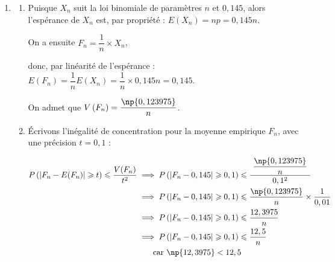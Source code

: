 \begin{enumerate}
\begin{enumerate}
\item Résolvons, pour $n$ entier naturel :

$\begin{aligned}
p_n \geqslant 0,99
&\iff 1 - 0,855^{n} \geqslant 0,99\\
&\iff  - 0,855^{n} \geqslant -0,01\\
&\iff 0,855^{n} \leqslant 0,01\quad \text{car } -1<0\\
&\iff \ln\left(0,855^{n}\right) \leqslant \ln(0,01) \quad \text{car ln est croissante sur }\R^{*+}\\
	&\iff n\ln\left(0,855\right) \leqslant \ln(0,01)\\
	&\iff n \geqslant \dfrac{\ln(0,01)}{\ln\left(0,855\right)} \quad \text{car } 0,855 <1 \text{ donc }\ln\left(0,855\right) < 0\\
\end{aligned}$

Or $\dfrac{\ln(0,01)}{\ln\left(0,855\right)} \approx 29,4$, donc c'est à partir de $n = 30$ que l'on a une probabilité $p_n$ supérieure ou égale à 0,99.
\end{enumerate}

\item 
	\begin{enumerate}
		\item Puisque $X_n$ suit la loi binomiale de paramètres $n$ et $0,145$, alors l'espérance de $X_n$ est, par propriété : $E(X_n) = np = 0,145n$.

On a ensuite $F_n = \dfrac{1}{n} \times X_n$,

donc, par linéarité de l'espérance : $E(F_n) = \dfrac{1}{n} E(X_n) = \dfrac{1}{n}\times 0,145n = 0,145$.

On admet que $V\left(F_{n}\right)=\dfrac{\np{0,123975}}{n}$.

		\item Écrivons l'inégalité de concentration pour la moyenne empirique $F_n$, avec une précision $t = 0,1$ :

$\begin{aligned}
P\left(\left|F_{n}-E(F_n)\right| \geqslant t\right) \leqslant \dfrac{V(F_n)}{t^2}
	&\implies P\left(\left|F_{n}- 0,145\right| \geqslant 0,1\right) \leqslant \dfrac{~\dfrac{\np{0,123975}}{n}~}{0,1^2}\\
	&\implies P\left(\left|F_{n}-0,145\right| \geqslant 0,1\right) \leqslant \dfrac{\np{0,123975}}{n}\times \dfrac{1}{0,01}\\
	&\implies P\left(\left|F_{n}-0,145\right| \geqslant 0,1\right) \leqslant \dfrac{12,3975}{n}\\
				&\implies P\left(\left|F_{n}-0,145\right| \geqslant 0,1\right) \leqslant \dfrac{12,5}{n}\\
	& \qquad \text{car } \np{12,3975} < 12,5
\end{aligned}$


\end{enumerate}
\end{enumerate}
